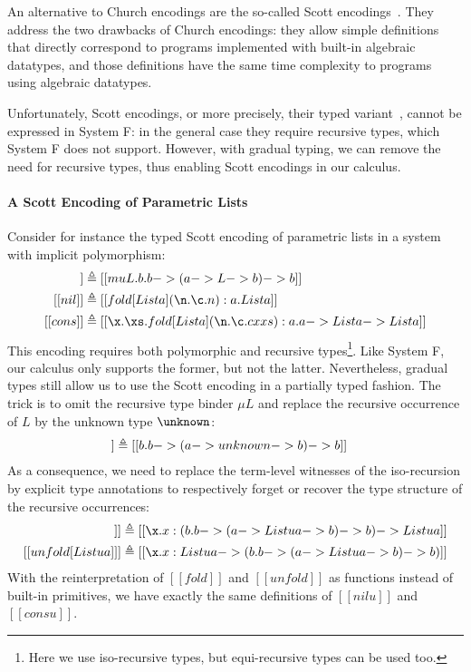 An alternative to Church encodings are the so-called Scott
encodings~\citep{curry1958combinatory}. They address the two drawbacks of Church
encodings: they allow simple definitions that directly correspond to programs
implemented with built-in algebraic datatypes, and those definitions have the same time
complexity to programs using algebraic datatypes.

Unfortunately, Scott encodings, or more precisely, their typed
variant~\citep{parigot1992recursive}, cannot be expressed in System F: in the
general case they require recursive types, which System F does not support.
However, with gradual typing, we can remove the need for recursive types, thus
enabling Scott encodings in our calculus.

\paragraph{A Scott Encoding of Parametric Lists}
Consider for instance the typed
Scott encoding of parametric lists in a system with implicit polymorphism:
\begin{align*}
   [[ List a ]] &\triangleq [[  mu L . \/b. b -> (a -> L -> b) -> b       ]] \\
   [[nil]] &\triangleq [[  fold [ List a ] (\n . \c . n ): \/ a . List a    ]] \\
   [[cons]] & \triangleq [[ \x . \xs . fold [List a]  (\n . \c. c x xs) :  \/a . a -> List a -> List a  ]]
\end{align*}
This encoding requires both polymorphic and recursive types\footnote{Here we use
iso-recursive types, but equi-recursive types can be used too.}. 
Like System F, our calculus 
only supports the former, but not the latter. Nevertheless, gradual types still
allow us to use the Scott encoding in a partially typed fashion.
The trick is to omit the recursive type binder $\mu L$ and replace the recursive
occurrence of $L$ by the unknown type $\unknown$:
\begin{align*}
   [[ Listu a  ]] &\triangleq [[\/ b. b -> (a -> unknown -> b) -> b]]
\end{align*}
As a consequence, we need to replace the term-level witnesses of the
iso-recursion by explicit type annotations to respectively forget or recover the type structure of
the recursive occurrences:
\begin{align*}
  [[ fold [Listu a] ]] & \triangleq [[\x . x : (\/b . b -> (a -> Listu a -> b) -> b) -> Listu a  ]] \\
  [[ unfold [Listu a] ]] & \triangleq [[ \x . x : Listu a -> (\/b . b -> (a -> Listu a -> b) -> b)     ]]
\end{align*}
With the reinterpretation of $[[fold]]$ and $[[unfold]]$ as functions instead of
built-in primitives, we have exactly the same definitions of $[[nilu]]$ and
$[[consu]]$.

